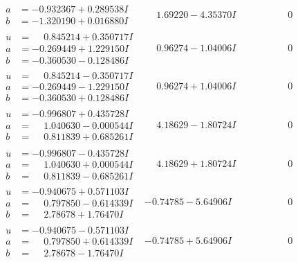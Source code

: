 \documentclass[1p]{elsarticle_modified}
\theoremstyle{definition}
\begin{document}
$$\begin{array}{c|c|c}
\begin{aligned}
a &= -0.932367 + 0.289538 I \\
b &= -1.320190 + 0.016880 I\end{aligned}
 & \phantom{-}1.69220 - 4.35370 I & \phantom{-0.000000 } 0 \\ \hline\begin{aligned}
u &= \phantom{-}0.845214 + 0.350717 I \\
a &= -0.269449 + 1.229150 I \\
b &= -0.360530 - 0.128486 I\end{aligned}
 & \phantom{-}0.96274 - 1.04006 I & \phantom{-0.000000 } 0 \\ \hline\begin{aligned}
u &= \phantom{-}0.845214 - 0.350717 I \\
a &= -0.269449 - 1.229150 I \\
b &= -0.360530 + 0.128486 I\end{aligned}
 & \phantom{-}0.96274 + 1.04006 I & \phantom{-0.000000 } 0 \\ \hline\begin{aligned}
u &= -0.996807 + 0.435728 I \\
a &= \phantom{-}1.040630 - 0.000544 I \\
b &= \phantom{-}0.811839 + 0.685261 I\end{aligned}
 & \phantom{-}4.18629 - 1.80724 I & \phantom{-0.000000 } 0 \\ \hline\begin{aligned}
u &= -0.996807 - 0.435728 I \\
a &= \phantom{-}1.040630 + 0.000544 I \\
b &= \phantom{-}0.811839 - 0.685261 I\end{aligned}
 & \phantom{-}4.18629 + 1.80724 I & \phantom{-0.000000 } 0 \\ \hline\begin{aligned}
u &= -0.940675 + 0.571103 I \\
a &= \phantom{-}0.797850 - 0.614339 I \\
b &= \phantom{-}2.78678 + 1.76470 I\end{aligned}
 & -0.74785 - 5.64906 I & \phantom{-0.000000 } 0 \\ \hline\begin{aligned}
u &= -0.940675 - 0.571103 I \\
a &= \phantom{-}0.797850 + 0.614339 I \\
b &= \phantom{-}2.78678 - 1.76470 I\end{aligned}
 & -0.74785 + 5.64906 I & \phantom{-0.000000 } 0 \\ \hline\begin{aligned}

\end{aligned}
\end{array}$$
\end{document}

